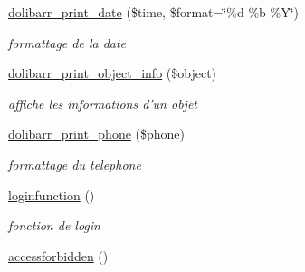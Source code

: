 \begin{CompactItemize}
\hyperlink{functions_8inc_8php_a6}{dolibarr\_\-print\_\-date} (\$time, \$format=\char`\"{}\%d \%b \%Y\char`\"{})
\begin{CompactList}\small\item\em formattage de la date \item\end{CompactList}\item 
\hyperlink{functions_8inc_8php_a7}{dolibarr\_\-print\_\-object\_\-info} (\$object)
\begin{CompactList}\small\item\em affiche les informations d'un objet \item\end{CompactList}\item 
\hyperlink{functions_8inc_8php_a8}{dolibarr\_\-print\_\-phone} (\$phone)
\begin{CompactList}\small\item\em formattage du telephone \item\end{CompactList}\item 
\hyperlink{functions_8inc_8php_a21}{loginfunction} ()
\begin{CompactList}\small\item\em fonction de login \item\end{CompactList}\item 
\hypertarget{functions_8inc_8php_a22}{
\hyperlink{functions_8inc_8php_a22}{accessforbidden} ()}
\label{functions_8inc_8php_a22}


\end{CompactItemize}

